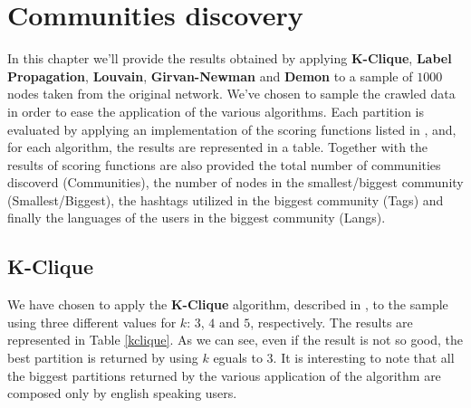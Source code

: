 \chapter{Communities discovery} %
\label{cha:communities_discovery}

In this chapter we'll provide the results obtained by applying \textbf{K-Clique}, \textbf{Label Propagation},
\textbf{Louvain}, \textbf{Girvan-Newman} and \textbf{Demon} to a sample of $1000$ nodes taken from the original
network. We've chosen to sample the crawled data in order to ease the application of the various algorithms.
Each partition is evaluated by applying an implementation of the scoring functions listed in
\cite{comm_ground_truth}, and, for each algorithm, the results are represented in a table. Together with the
results of scoring functions are also provided the total number of communities discoverd (Communities), the
number of nodes in the smallest/biggest community (Smallest/Biggest), the hashtags utilized in the biggest
community (Tags) and finally the languages of the users in the biggest community (Langs).

\section{K-Clique} %
\label{sec:k_clique}
    We have chosen to apply the \textbf{K-Clique} algorithm, described in \cite{k_clique}, to the sample using
    three different values for $k$: $3$, $4$ and $5$, respectively. The results are represented in Table
    \ref{kclique}. As we can see, even if the result is not so good, the best partition is returned by using $k$
    eguals to $3$. It is interesting to note that all the biggest partitions returned by the various application
    of the algorithm are composed only by english speaking users.

